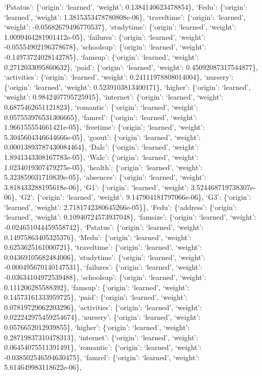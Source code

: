 \documentclass[
]{article}
\begin{document}
`Pstatus': \{`origin': `learned', `weight': 0.1384140623478854\},
`Fedu': \{`origin': `learned', `weight': 1.3815353478780808e-06\},
`traveltime': \{`origin': `learned', `weight': -0.05682679496770537\},
`studytime': \{`origin': `learned', `weight': 1.0099464281901412e-05\},
`failures': \{`origin': `learned', `weight': -0.05554902196378678\},
`schoolsup': \{`origin': `learned', `weight': -0.14973724028142785\},
`famsup': \{`origin': `learned', `weight': 0.2712033095860632\}, `paid':
\{`origin': `learned', `weight': 0.45092087317544877\}, `activities':
\{`origin': `learned', `weight': 0.24111978808014004\}, `nursery':
\{`origin': `learned', `weight': 0.5239103813400171\}, `higher':
\{`origin': `learned', `weight': 0.9842407795725915\}, `internet':
\{`origin': `learned', `weight': 0.6875462651121823\}, `romantic':
\{`origin': `learned', `weight': 0.057553976531306665\}, `famrel':
\{`origin': `learned', `weight': 1.966155554661421e-05\}, `freetime':
\{`origin': `learned', `weight': 5.3045604346644666e-05\}, `goout':
\{`origin': `learned', `weight': 0.00013893787430084464\}, `Dalc':
\{`origin': `learned', `weight': 1.8941343308167783e-05\}, `Walc':
\{`origin': `learned', `weight': 1.0234019307479275e-05\}, `health':
\{`origin': `learned', `weight': 5.323859031710839e-05\}, `absences':
\{`origin': `learned', `weight': 3.818433288195618e-06\}, `G1':
\{`origin': `learned', `weight': 3.524468719738307e-06\}, `G2':
\{`origin': `learned', `weight': 9.147904181797066e-06\}, `G3':
\{`origin': `learned', `weight': 2.7181742380645266e-05\}\}, `Fedu':
\{`address': \{`origin': `learned', `weight': 0.10940724573937048\},
`famsize': \{`origin': `learned', `weight': -0.024651044459558742\},
`Pstatus': \{`origin': `learned', `weight': 0.14975863405325376\},
`Medu': \{`origin': `learned', `weight': 0.6253625161000721\},
`traveltime': \{`origin': `learned', `weight': 0.04369105682484006\},
`studytime': \{`origin': `learned', `weight': -0.000495670140147531\},
`failures': \{`origin': `learned', `weight': -0.03634104972539488\},
`schoolsup': \{`origin': `learned', `weight': 0.111206285588392\},
`famsup': \{`origin': `learned', `weight': 0.14573161333959725\},
`paid': \{`origin': `learned', `weight': 0.07819729062203296\},
`activities': \{`origin': `learned', `weight': 0.022242975459254674\},
`nursery': \{`origin': `learned', `weight': 0.0576652012939855\},
`higher': \{`origin': `learned', `weight': 0.28719837310478313\},
`internet': \{`origin': `learned', `weight': 0.06454075511391491\},
`romantic': \{`origin': `learned', `weight': -0.038502546594630475\},
`famrel': \{`origin': `learned', `weight': 5.614649983118622e-06\},
\end{document}
